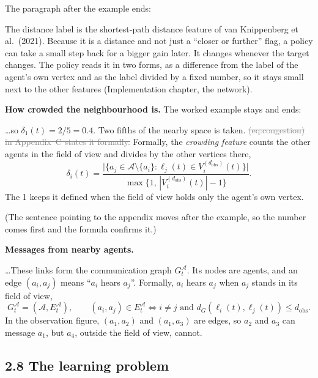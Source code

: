 \documentclass[11pt,a4paper]{article}
\newcommand{\new}[1]{\textcolor{newc}{#1}}
\newcommand{\old}[1]{\textcolor{gray}{\sout{#1}}}
\newenvironment{greenblock}{\color{newc}}{}
\begin{document}
The paragraph after the example ends:

The distance label is the shortest-path distance feature of van Knippenberg
et al.\ (2021). Because it is a distance and not just a ``closer or further''
flag, a policy can take a small step back for a bigger gain later. It
changes whenever the target changes. \new{The policy reads it in two forms,
as a difference from the label of the agent's own vertex and as the label
divided by a fixed number, so it stays small next to the other features
(Implementation chapter, the network).}

\textbf{How crowded the neighbourhood is.} The worked example stays and ends:

\dots so $\delta_1(t)=2/5=0.4$. Two fifths of the nearby space is taken.
\old{(eq:congestion) in Appendix~C states it formally.} \new{Formally, the
\emph{crowding feature} counts the other agents in the field of view and
divides by the other vertices there,}
\begin{greenblock}
\[
  \delta_i(t) =
  \frac{\bigl|\{a_j \in \mathcal{A}\setminus\{a_i\} :
                 \ell_j(t) \in V^{(d_{\mathrm{obs}})}_i(t)\}\bigr|}
       {\max\bigl\{1,\, |V^{(d_{\mathrm{obs}})}_i(t)| - 1\bigr\}} .
  \tag{crowding feature}
\]
The 1 keeps it defined when the field of view holds only the agent's own
vertex.
\end{greenblock}

(The sentence pointing to the appendix moves after the example, so the
number comes first and the formula confirms it.)

\textbf{Messages from nearby agents.}

\dots These links form the communication graph $G^{\mathcal{A}}_t$. Its
nodes are agents, and an edge $(a_i,a_j)$ means ``$a_i$ hears $a_j$''.
\new{Formally, $a_i$ hears $a_j$ when $a_j$ stands in its field of view,}
\begin{greenblock}
\[
  G^{\mathcal{A}}_t = (\mathcal{A}, E^{\mathcal{A}}_t), \qquad
  (a_i, a_j) \in E^{\mathcal{A}}_t \iff
  i \neq j \text{ and } d_G(\ell_i(t), \ell_j(t)) \le d_{\mathrm{obs}} .
  \tag{communication graph}
\]
\end{greenblock}
In the observation figure, \new{$(a_1,a_2)$ and $(a_1,a_3)$ are edges, so}
$a_2$ and $a_3$ can message $a_1$, but $a_4$, outside the field of view,
cannot.

\subsection*{2.8 The learning problem}
\end{document}
